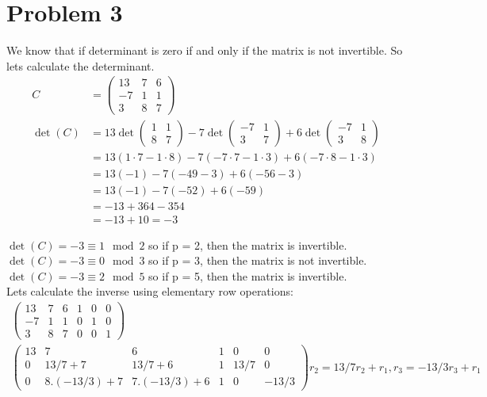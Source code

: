 \documentclass{article}
\begin{document}
\section*{Problem 3}
We know that if determinant is zero if and only if the matrix is not invertible. So lets calculate the determinant.
\begin{align*}
    C &= \begin{pmatrix}
        13 & 7 & 6 \\
        -7 & 1 & 1 \\
        3 & 8 & 7
    \end{pmatrix} \\
    \det(C) &= 13 \det \begin{pmatrix}
        1 & 1 \\
        8 & 7
    \end{pmatrix} - 7 \det \begin{pmatrix}
        -7 & 1 \\
        3 & 7
    \end{pmatrix} + 6 \det \begin{pmatrix}
        -7 & 1 \\
        3 & 8
    \end{pmatrix} \\
    &= 13(1 \cdot 7 - 1 \cdot 8) - 7(-7 \cdot 7 - 1 \cdot 3) + 6(-7 \cdot 8 - 1 \cdot 3) \\
    &= 13(-1) - 7(-49 - 3) + 6(-56 - 3) \\
    &= 13(-1) - 7(-52) + 6(-59) \\
    &= -13 + 364 - 354 \\
    &= -13 + 10 = -3
\end{align*}

\(\det(C) = -3 \equiv 1 \mod 2\) so if p = 2, then the matrix is invertible. \\
\(\det(C) = -3 \equiv 0 \mod 3\) so if p = 3, then the matrix is not invertible. \\
\(\det(C) = -3 \equiv 2 \mod 5\) so if p = 5, then the matrix is invertible. \\

Lets calculate the inverse using elementary row operations:
\begin{align*}
    \left(
    \begin{array}{ccc|ccc}
        13 & 7 & 6 & 1 & 0 & 0 \\
        -7 & 1 & 1 & 0 & 1 & 0 \\
        3 & 8 & 7 & 0 & 0 & 1
    \end{array}
    \right) \\
    \left(
    \begin{array}{ccc|ccc}
        13 & 7        & 6        & 1 & 0    & 0 \\
        0  & 13/7 + 7 & 13/7 + 6 & 1 & 13/7 & 0 \\
        0  & 8.(-13/3) + 7        & 7.(-13/3) + 6        & 1 & 0    & -13/3
    \end{array}
    \right) r_2 = 13/7 r_2 + r_1, r_3 = -13/3r_3 + r_1 \\
\end{align*}
\end{document}
